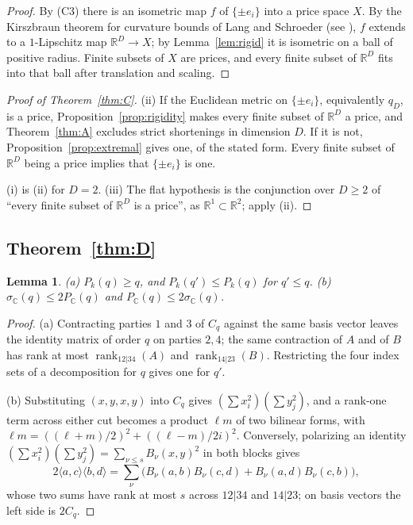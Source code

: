 \documentclass[11pt,a4paper]{article}
\newtheorem{lemma}{Lemma}[section]
\theoremstyle{definition}
\newcommand{\R}{\mathbb{R}}
\newcommand{\C}{\mathbb{C}}
\newcommand{\kk}{k}
\newcommand{\rk}{\operatorname{rank}}
\newcommand{\CS}{\textup{C3}}
\begin{document}
\begin{proof}
By (\CS) there is an isometric map $f$ of $\{\pm e_i\}$ into a price space $X$.
By the Kirszbraun theorem for curvature bounds of Lang and Schroeder
\cite{LS} (see \cite[Thm.~5.4]{AKP}), $f$ extends to a $1$-Lipschitz map
$\R^D\to X$; by Lemma~\ref{lem:rigid} it is isometric on a ball of positive
radius. Finite subsets of $X$ are prices, and every finite subset of $\R^D$
fits into that ball after translation and scaling.
\end{proof}

\begin{proof}[Proof of Theorem~\ref{thm:C}]
(ii) If the Euclidean metric on $\{\pm e_i\}$, equivalently $q_D$, is a price,
Proposition~\ref{prop:rigidity} makes every finite subset of $\R^D$ a price, and
Theorem~\ref{thm:A} excludes strict shortenings in dimension $D$. If it is not,
Proposition~\ref{prop:extremal} gives one, of the stated form. Every finite
subset of $\R^D$ being a price implies that $\{\pm e_i\}$ is one.

(i) is (ii) for $D=2$. (iii) The flat hypothesis is the conjunction over $D\ge2$
of ``every finite subset of $\R^D$ is a price'', as $\R^1\subset\R^2$; apply (ii).
\end{proof}

\subsection{Theorem~\ref{thm:D}}

\begin{lemma}\label{lem:crossing}
(a) $P_\kk(q)\ge q$, and $P_\kk(q')\le P_\kk(q)$ for $q'\le q$.
(b) $\sigma_\C(q)\le2P_\C(q)$ and $P_\C(q)\le2\sigma_\C(q)$.
\end{lemma}

\begin{proof}
(a) Contracting parties $1$ and $3$ of $C_q$ against the same basis vector
leaves the identity matrix of order $q$ on parties $2,4$; the same contraction
of $A$ and of $B$ has rank at most $\rk_{12|34}(A)$ and $\rk_{14|23}(B)$. Restricting
the four index sets of a decomposition for $q$ gives one for $q'$.

(b) Substituting $(x,y,x,y)$ into $C_q$ gives $(\sum x_i^2)(\sum y_j^2)$, and a
rank-one term across either cut becomes a product $\ell m$ of two bilinear forms,
with $\ell m=((\ell+m)/2)^2+((\ell-m)/2i)^2$. Conversely, polarizing an identity
$(\sum x_i^2)(\sum y_j^2)=\sum_{\nu\le s}B_\nu(x,y)^2$ in both blocks gives
\[
2\langle a,c\rangle\langle b,d\rangle
=\sum_\nu\bigl(B_\nu(a,b)B_\nu(c,d)+B_\nu(a,d)B_\nu(c,b)\bigr),
\]
whose two sums have rank at most $s$ across $12|34$ and $14|23$; on basis
vectors the left side is $2C_q$.
\end{proof}
\end{document}
